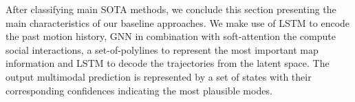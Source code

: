 After classifying main SOTA methods, we conclude this section presenting the main characteristics of our baseline approaches. We make use of LSTM to encode the past motion history, GNN in combination with soft-attention the compute social interactions, a set-of-polylines to represent the most important map information and LSTM to decode the trajectories from the latent space. The output multimodal prediction is represented by a set of states with their corresponding confidences indicating the most plausible modes.


%

